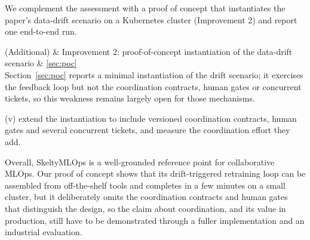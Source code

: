 
We complement the assessment with a proof of concept that instantiates the paper's data-drift scenario on a Kubernetes cluster (Improvement 2) and report one end-to-end run.

(Additional) & Improvement 2: proof-of-concept instantiation of the data-drift scenario & \ref{sec:poc} \\


Section~\ref{sec:poc} reports a minimal instantiation of the drift scenario; it exercises the feedback loop but not the coordination contracts, human gates or concurrent tickets, so this weakness remains largely open for those mechanisms.

(v) extend the instantiation to include versioned coordination contracts, human gates and several concurrent tickets, and measure the coordination effort they add.

Overall, SkeltyMLOps is a well-grounded reference point for collaborative MLOps. Our proof of concept shows that its drift-triggered retraining loop can be assembled from off-the-shelf tools and completes in a few minutes on a small cluster, but it deliberately omits the coordination contracts and human gates that distinguish the design, so the claim about coordination, and its value in production, still have to be demonstrated through a fuller implementation and an industrial evaluation.
